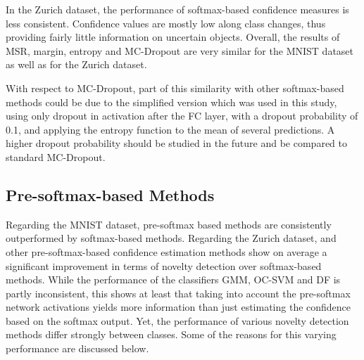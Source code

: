 \documentclass[10pt]{article}
\begin{document}
In the Zurich dataset, the performance of softmax-based confidence measures is less consistent. Confidence values are mostly low along class changes, thus providing fairly little information on uncertain objects. Overall, the results of \gls{MSR}, margin, entropy and \gls{MC-Dropout} are very similar for the \gls{MNIST} dataset as well as for the Zurich dataset. 

With respect to \gls{MC-Dropout}, part of this similarity with other softmax-based methods could be due to the simplified version which was used in this study, using only dropout in activation after the \gls{FC} layer, with a dropout probability of 0.1, and applying the entropy function to the mean of several predictions. A higher dropout probability should be studied in the future and be compared to standard \gls{MC-Dropout}.

\subsection{Pre-softmax-based Methods}
Regarding the \gls{MNIST} dataset, pre-softmax based methods are consistently outperformed by softmax-based methods. Regarding the Zurich dataset,  and other pre-softmax-based confidence estimation methods show on average a significant improvement in terms of novelty detection over softmax-based methods. While the performance of the classifiers \gls{GMM}, \gls{OC-SVM} and \gls{DF} is partly inconsistent, this shows at least that taking into account the pre-softmax network activations yields more information than just estimating the confidence based on the softmax output. Yet, the performance of various novelty detection methods differ strongly between classes. Some of the reasons for this varying performance are discussed below.

\end{document}
